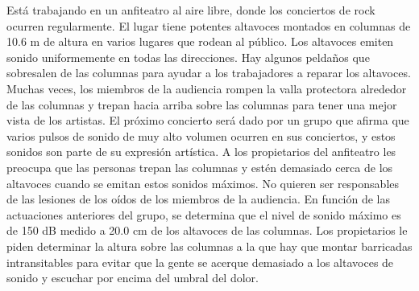 \item Está trabajando en un anfiteatro al aire libre, donde los conciertos de rock ocurren regularmente. El lugar tiene potentes altavoces montados en columnas de 10.6 m de altura en varios lugares que rodean al público. Los altavoces emiten sonido uniformemente en todas las direcciones. Hay algunos peldaños que sobresalen de las columnas para ayudar a los trabajadores a reparar los altavoces. Muchas veces, los miembros de la audiencia rompen la valla protectora alrededor de las columnas y trepan hacia arriba sobre las columnas para tener una mejor vista de los artistas. El próximo concierto será dado por un grupo que afirma que varios pulsos de sonido de muy alto volumen ocurren en sus conciertos, y estos sonidos son parte de su expresión artística. A los propietarios del anfiteatro les preocupa que las personas trepan las columnas y estén demasiado cerca de los altavoces cuando se emitan estos sonidos máximos. No quieren ser responsables de las lesiones de los oídos de los miembros de la audiencia. En función de las actuaciones anteriores del grupo, se determina que el nivel de sonido máximo es de 150 dB medido a 20.0 cm de los altavoces de las columnas. Los propietarios le piden determinar la altura sobre las columnas a la que hay que montar barricadas intransitables para evitar que la gente se acerque demasiado a los altavoces de sonido y escuchar por encima del umbral del dolor.